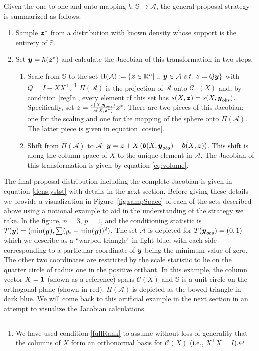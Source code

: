 \documentclass[ba]{imsart}
\newcommand{\by}{\mbox{\boldmath $y$}}
\newcommand{\bz}{\mbox{\boldmath $z$}}
\newcommand{\bb}{\mbox{\boldmath $b$}}
\newcommand{\mc}{\mathcal}
\newcommand{\response}[1]{{\color{blue}#1}}
\begin{document}
Given the one-to-one and onto mapping $h: \mathbb{S} \rightarrow \mathcal{A}$, the general proposal strategy is summarized as follows:
\begin{enumerate}
\item Sample $\bz^*$ from a distribution with known density \response{whose support is the entirety of} $\mathbb{S}$.
\item Set $\by = h(\bz^*)$ and calculate the Jacobian of this transformation in two steps.
\begin{enumerate}
\item Scale from $\mathbb{S}$ to the set $\Pi(\mathcal{A}):= \{\bz\in \mathbb{R}^n |\ \exists\ \by\in \mathcal{A}\ s.t.\ \bz=Q \by \}$ with $Q = I - XX^{\top}$. \footnote{We have used condition \ref{fullRank} to assume  without loss of generality  that the columns of $X$ form an orthonormal basis for $\mc{C}(X)$ (i.e., $X^\top X=I$).} $\Pi(\mathcal{A})$ is the projection of $\mathcal{A}$ onto $\mathcal{C}^{\perp}(X)$ and, by condition \ref{regIn}, every element of this set has $s(X, \bz) = s(X, \by_{obs})$. Specifically, set $\bz=\frac{s(X,\boldsymbol{y}_{obs})}{s(X, \boldsymbol{z}^{*})}\bz^{*}$. There are two pieces of this Jacobian: one for the scaling and one for the mapping of the sphere onto $\Pi(\mathcal{A})$. The latter piece is given in equation \eqref{cosine}.
\item Shift  from $\Pi(\mathcal{A})$ to $\mathcal{A}$: $\by=\bz+X\left(\bb(X, \by_{obs})-\bb(X, \bz)\right)$. This shift is along the column space of $X$ to the unique element in $\mathcal{A}$. The Jacobian of this transformation is given by equation \eqref{eq:volume}.
\end{enumerate}
\end{enumerate}

The final proposal distribution including the complete Jacobian is given in equation \eqref{dens:ystst} with details in the next section. Before giving these details we provide a visualization  in Figure~\ref{fig:sampSpace} of each of the sets described above using a notional example to aid in the understanding of the strategy we take. In the figure, $n = 3$, $p=1$, and the conditioning statistic is $T(\by)=(\min(\by), \sum (y_i - \min(\by))^2)$. The set $\mathcal{A}$ is depicted for $T(\by_{obs})=(0,1)$ which we describe as a ``warped triangle'' in light blue, with each side corresponding to a particular coordinate of $\by$ being the minimum value of zero. The other two coordinates are restricted by the scale statistic to lie on the quarter circle of radius one in the positive orthant. In this example, the column vector $X=\bf{1}$ (shown as a reference) spans $\mc{C}(X)$  and $\mathbb{S}$ is a unit circle on the orthogonal plane (shown in red). $\Pi(\mathcal{A})$ is depicted as the bowed triangle in dark blue. We will come back to this artificial example in the next section in an attempt to visualize the Jacobian calculations.
\end{document}
